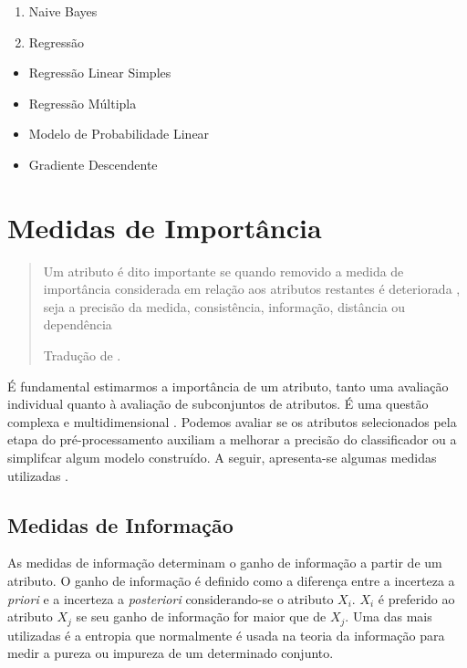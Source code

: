 \documentclass[
]{book}
\providecommand{\tightlist}{%
  \setlength{\itemsep}{0pt}\setlength{\parskip}{0pt}}
\begin{document}
\begin{enumerate}
\def\labelenumi{\arabic{enumi}.}
\setcounter{enumi}{2}
\item
  Naive Bayes
\item
  Regressão
\end{enumerate}

\begin{itemize}
\tightlist
\item
  Regressão Linear Simples
\item
  Regressão Múltipla
\item
  Modelo de Probabilidade Linear
\item
  Gradiente Descendente
\end{itemize}

\hypertarget{medidas-de-importuxe2ncia}{%
\section{Medidas de Importância}\label{medidas-de-importuxe2ncia}}

\begin{quote}
Um atributo é dito importante se quando removido a medida de importância considerada em relação aos atributos restantes é deteriorada , seja a precisão da medida, consistência, informação, distância ou dependência

Tradução de \citet{liu2012feature}.
\end{quote}

É fundamental estimarmos a importância de um atributo, tanto uma avaliação individual quanto à avaliação de subconjuntos de atributos. É uma questão complexa e multidimensional \citep{liu2012feature}. Podemos avaliar se os atributos selecionados pela etapa do pré-processamento auxiliam a melhorar a precisão do classificador ou a simplifcar algum modelo construído. A seguir, apresenta-se algumas medidas utilizadas \citep{lee2005seleccao}.

\hypertarget{medidas-de-informauxe7uxe3o}{%
\subsection{Medidas de Informação}\label{medidas-de-informauxe7uxe3o}}

As medidas de informação determinam o ganho de informação a partir de um atributo. O ganho de informação é definido como a diferença entre a incerteza a \emph{priori} e a incerteza a \emph{posteriori} considerando-se o atributo \(X_i\). \(X_i\) é preferido ao atributo \(X_j\) se seu ganho de informação for maior que de \(X_j\). Uma das mais utilizadas é a entropia que normalmente é usada na teoria da informação para medir a pureza ou impureza de um determinado conjunto.
\end{document}
